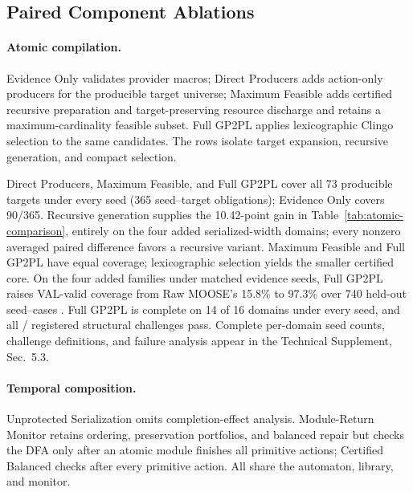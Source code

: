 \subsection{Paired Component Ablations}
\label{sec:paired-ablation-results}

\paragraph{Atomic compilation.}
Evidence Only validates provider macros; Direct Producers adds action-only
producers for the producible target universe; Maximum Feasible adds certified
recursive preparation and target-preserving resource discharge and retains a
maximum-cardinality feasible subset. Full GP2PL applies lexicographic Clingo
selection to the same candidates. The rows isolate target expansion, recursive
generation, and compact selection.



Direct Producers, Maximum Feasible, and Full GP2PL cover all 73 producible
targets under every seed (365 seed--target obligations); Evidence Only covers
90/365. Recursive generation supplies the 10.42-point gain in
Table~\ref{tab:atomic-comparison}, entirely on the four added serialized-width
domains; every nonzero averaged paired difference favors a recursive variant.
Maximum Feasible and Full GP2PL have equal coverage; lexicographic selection
yields the smaller certified core.
On the four added families under matched evidence seeds, Full GP2PL raises
VAL-valid coverage from Raw MOOSE's 15.8\% to 97.3\% over 740 held-out
seed--cases \cite{Chen2025MooseExtended}. Full GP2PL is complete on 14 of 16
domains under every seed, and all \ChallengeSuccessCount{}/\ChallengeCaseCount{}
registered structural challenges pass. Complete per-domain seed counts,
challenge definitions, and failure analysis appear in the Technical Supplement,
Sec.~5.3.

\paragraph{Temporal composition.}
Unprotected Serialization omits completion-effect analysis. Module-Return
Monitor retains ordering, preservation portfolios, and balanced repair but
checks the DFA only after an atomic module finishes all primitive actions;
Certified Balanced checks after every primitive action. All share the
automaton, library, and monitor.



